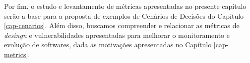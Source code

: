 %

Por fim, o estudo e levantamento de métricas apresentadas no presente capítulo serão a base para a proposta de exemplos de Cenários de Decisões do Capítulo \ref{cap-cenarios}. Além disso, buscamos compreender e relacionar as métricas de \emph{desingn} e vulnerabilidades apresentadas para melhorar o monitoramento e evolução de softwares, dada as motivações apresentadas no Capítulo \ref{cap-metrics}.

%